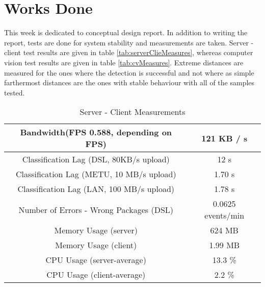 \section{Works Done}
\label{sec:worksDone}
This week is dedicated to conceptual design report. In addition to writing the report, tests are done for system stability and measurements are taken. Server - client test results are given in table \ref{tab:serverClieMeasures}, whereas computer vision test results are given in table \ref{tab:cvMeasures}. Extreme distances are measured for the ones where the detection is successful and not where as simple farthermost distances are the ones with stable behaviour with all of the samples tested.






\begin{table}[]
    \centering
    \begin{tabular}{|c|c|}
         \hline
         Bandwidth(FPS 0.588, depending on FPS)                              &  121 KB / s  \\
         \hline
         Classification Lag (DSL, 80KB/s upload)                             & 12 s \\
         \hline
         Classification Lag (METU, 10 MB/s upload)                           & 1.70 s \\
         \hline
         Classification Lag (LAN, 100 MB/s upload)                           & 1.78 s \\
         \hline
         Number of Errors - Wrong Packages (DSL)                             & 0.0625 events/min \\
         \hline
         Memory Usage (server)                                               & 624 MB \\
         \hline
         Memory Usage (client)                                               & 1.99 MB \\
         \hline
         CPU Usage (server-average)                                          & 13.3 \% \\
         \hline
         CPU Usage (client-average)                                          & 2.2 \% \\
         \hline
    \end{tabular}
    \caption{Server - Client Measurements}
    \label{tab:serverCliMeasures}
\end{table}


